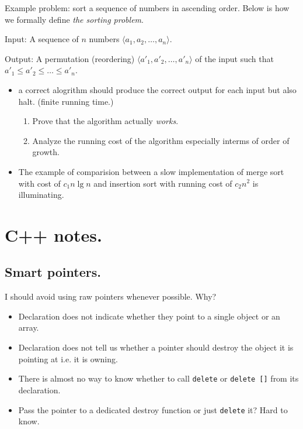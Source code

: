 \documentclass[a4paper]{article}
\begin{document}
Example problem: sort a sequence of numbers in ascending order. Below is how we formally define \emph{the sorting problem}.

Input: A sequence of \(n\) numbers \(\langle a_1, a_2, \ldots, a_n\rangle\). 

Output: A permutation (reordering) \(\langle a'_1, a'_2, \ldots, a'_n\rangle\) of the input such that \(a'_1 \leq a'_2 \leq \ldots \leq a'_n\).

\begin{itemize}
    \item a correct alogrithm should produce the correct output for each input but also halt. (finite running time.)
          \begin{enumerate}
              \item Prove that the algorithm actually \emph{works}.
              \item Analyze the running cost of the algorithm especially interms of order of growth.
          \end{enumerate}
    \item The example of comparision between a slow implementation of merge sort with cost of \(c_1n\lg{n}\) and insertion sort with running cost of
          \(c_2n^2\) is illuminating.
\end{itemize}

\section*{C++ notes.}

\subsection*{Smart pointers.}

I should avoid using raw pointers whenever possible. Why?
\lstset{style=custom-cpp}

\begin{itemize}
    \item Declaration does not indicate whether they point to a single object or an array.
    \item Declaration does not tell us whether a pointer should destroy the object it is pointing at i.e. it is owning.
    \item There is almost no way to know whether to call \lstinline{delete} or \lstinline{delete []} from its declaration.
    \item Pass the pointer to a dedicated destroy function or just \lstinline{delete} it? Hard to know.
\end{itemize}
\end{document}
